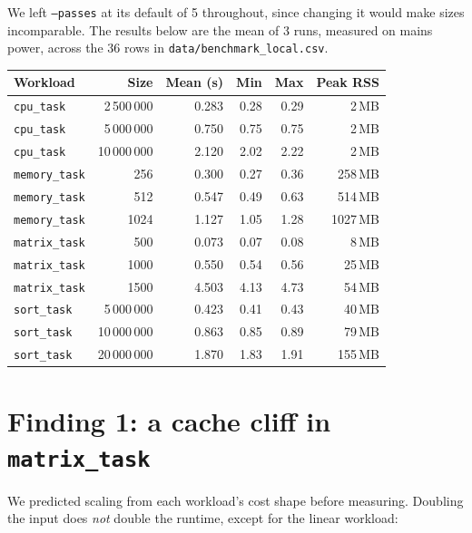 \documentclass[11pt]{article}
\newcommand{\code}[1]{\texttt{#1}}
\begin{document}
We left \code{--passes} at its default of 5 throughout, since changing it would make sizes
incomparable. The results below are the mean of 3 runs, measured on mains power, across the 36
rows in \code{data/benchmark\_local.csv}.

\begin{center}
\begin{tabular}{lrrrrr}
\toprule
Workload & Size & Mean (s) & Min & Max & Peak RSS \\
\midrule
\code{cpu\_task}    & 2\,500\,000  & 0.283 & 0.28 & 0.29 & 2\,MB \\
\code{cpu\_task}    & 5\,000\,000  & 0.750 & 0.75 & 0.75 & 2\,MB \\
\code{cpu\_task}    & 10\,000\,000 & 2.120 & 2.02 & 2.22 & 2\,MB \\
\code{memory\_task} & 256          & 0.300 & 0.27 & 0.36 & 258\,MB \\
\code{memory\_task} & 512          & 0.547 & 0.49 & 0.63 & 514\,MB \\
\code{memory\_task} & 1024         & 1.127 & 1.05 & 1.28 & 1027\,MB \\
\code{matrix\_task} & 500          & 0.073 & 0.07 & 0.08 & 8\,MB \\
\code{matrix\_task} & 1000         & 0.550 & 0.54 & 0.56 & 25\,MB \\
\code{matrix\_task} & 1500         & 4.503 & 4.13 & 4.73 & 54\,MB \\
\code{sort\_task}   & 5\,000\,000  & 0.423 & 0.41 & 0.43 & 40\,MB \\
\code{sort\_task}   & 10\,000\,000 & 0.863 & 0.85 & 0.89 & 79\,MB \\
\code{sort\_task}   & 20\,000\,000 & 1.870 & 1.83 & 1.91 & 155\,MB \\
\bottomrule
\end{tabular}
\end{center}

\section{Finding 1: a cache cliff in \code{matrix\_task}}
\label{sec:finding1}
We predicted scaling from each workload's cost shape before measuring. Doubling the input does
\emph{not} double the runtime, except for the linear workload:
\end{document}
